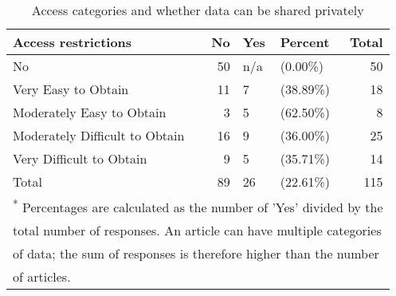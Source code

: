 \begin{table}[!h]
\centering
\caption{\label{tab:access_provision}Access categories and whether data can be shared privately}
\centering
\begin{tabular}[t]{lrllr}
\toprule
Access restrictions & No & Yes & Percent & Total\\
\midrule
No & 50 & n/a & (0.00\%) & 50\\
Very Easy to Obtain & 11 & 7 & (38.89\%) & 18\\
Moderately Easy to Obtain & 3 & 5 & (62.50\%) & 8\\
Moderately Difficult to Obtain & 16 & 9 & (36.00\%) & 25\\
Very Difficult to Obtain & 9 & 5 & (35.71\%) & 14\\
\addlinespace
Total & 89 & 26 & (22.61\%) & 115\\
\bottomrule
\multicolumn{5}{l}{\textsuperscript{*} Percentages are calculated as the number of 'Yes' divided by the}\\
\multicolumn{5}{l}{total number of responses. An article can have multiple categories}\\
\multicolumn{5}{l}{of data; the sum of responses is therefore higher than the number}\\
\multicolumn{5}{l}{of articles.}\\
\end{tabular}
\end{table}
